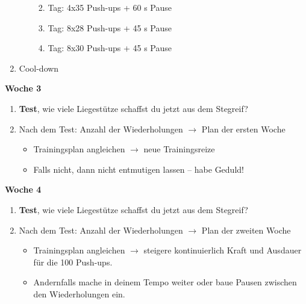 \begin{enumerate}
\begin{itemize}
    \begin{enumerate}
    \def\labelenumii{\arabic{enumii}.}
    \item
      Tag: 4x35 Push-ups + 60 s Pause
    \item
      Tag: 8x28 Push-ups + 45 s Pause
    \item
      Tag: 8x30 Push-ups + 45 s Pause
    \end{enumerate}
  \end{itemize}
\item
  Cool-down
\end{enumerate}

\textbf{Woche 3}

\begin{enumerate}
\item
  \textbf{Test}, wie viele Liegestütze schaffst du jetzt aus dem
  Stegreif?
\item
  Nach dem Test: Anzahl der Wiederholungen $\to$ Plan der ersten Woche

  \begin{itemize}
  \item
    Trainingsplan angleichen $\to$ neue Trainingsreize
  \item
    Falls nicht, dann nicht entmutigen lassen -- habe Geduld!
  \end{itemize}
\end{enumerate}

\textbf{Woche 4}

\begin{enumerate}
\item
  \textbf{Test}, wie viele Liegestütze schaffst du jetzt aus dem
  Stegreif?
\item
  Nach dem Test: Anzahl der Wiederholungen $\to$ Plan der zweiten
  Woche

  \begin{itemize}
  \item
    Trainingsplan angleichen $\to$ steigere kontinuierlich Kraft und
    Ausdauer für die 100 Push-ups.
  \item
    Andernfalls mache in deinem Tempo weiter oder baue Pausen zwischen
    den Wiederholungen ein.
  \end{itemize}
\end{enumerate}
